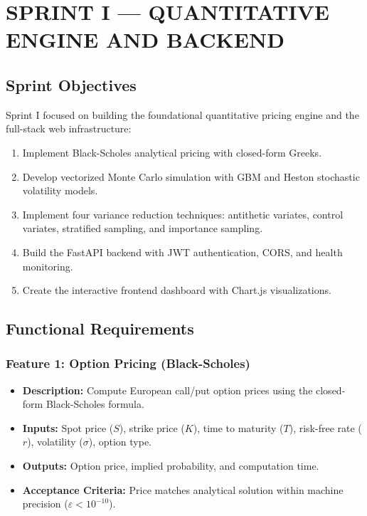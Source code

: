 \documentclass[12pt,a4paper]{report}
\begin{document}

\chapter{SPRINT I --- QUANTITATIVE ENGINE AND BACKEND}

\section{Sprint Objectives}

Sprint I focused on building the foundational quantitative pricing engine and the full-stack web infrastructure:

\begin{enumerate}
    \item Implement Black-Scholes analytical pricing with closed-form Greeks.
    \item Develop vectorized Monte Carlo simulation with GBM and Heston stochastic volatility models.
    \item Implement four variance reduction techniques: antithetic variates, control variates, stratified sampling, and importance sampling.
    \item Build the FastAPI backend with JWT authentication, CORS, and health monitoring.
    \item Create the interactive frontend dashboard with Chart.js visualizations.
\end{enumerate}

\section{Functional Requirements}

\subsection{Feature 1: Option Pricing (Black-Scholes)}

\begin{itemize}
    \item \textbf{Description:} Compute European call/put option prices using the closed-form Black-Scholes formula.
    \item \textbf{Inputs:} Spot price ($S$), strike price ($K$), time to maturity ($T$), risk-free rate ($r$), volatility ($\sigma$), option type.
    \item \textbf{Outputs:} Option price, implied probability, and computation time.
    \item \textbf{Acceptance Criteria:} Price matches analytical solution within machine precision ($\varepsilon < 10^{-10}$).
\end{itemize}
\end{document}
